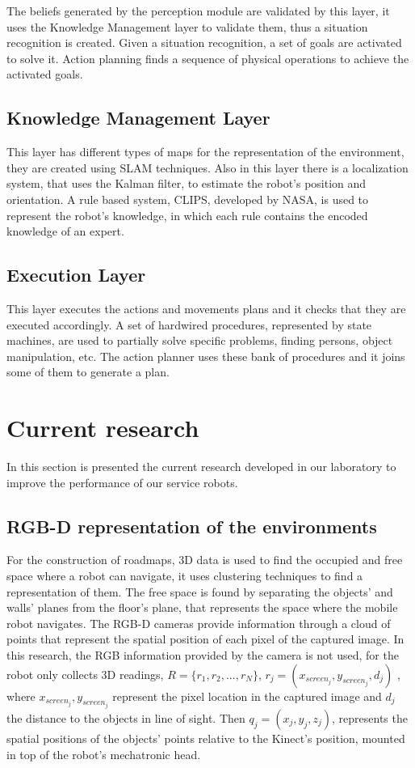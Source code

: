 \documentclass{llncs}
\begin{document}
The beliefs generated by the perception module are validated by this layer, it uses the Knowledge Management layer
to validate them, thus a situation recognition is created.
Given a situation recognition, a set of goals are activated to solve it.
Action planning finds a sequence of physical operations to achieve the activated goals.


\subsection{Knowledge Management Layer}

This layer has different types of maps for the representation of the environment, they are created using 
SLAM techniques.
Also in this layer there is a localization system, that uses the Kalman filter, to estimate the robot's position and orientation.
A rule based system, CLIPS, developed by NASA, is used to represent the robot's knowledge, in which each rule contains the
encoded knowledge of an expert.


\subsection{Execution Layer}
This layer executes the actions and movements plans and it checks that they are executed accordingly.
A set of hardwired procedures, represented by state machines, are used to partially solve specific problems, finding persons,
object manipulation, etc. The action planner uses these bank of procedures and it joins some of them to generate a plan.



\section{Current research}\label{sec:CurrentResearch}
In this section is presented the current research developed in our laboratory to improve the performance of our service
robots.

\subsection{RGB-D representation of the environments}\label{subsec:SurfRecon}
For the construction of roadmaps, 3D data is used to find the occupied and free space where a robot can
navigate, it uses clustering techniques to find a representation of them.
The free space is found by separating the objects' and walls' planes from the floor's plane, that represents the space where the mobile
robot navigates.
The RGB-D cameras provide information through a cloud of points that represent the spatial position of each pixel of the 
captured image.  In this research, the RGB information provided by the camera is not used, for the
robot only collects 3D readings, \(R=\{ r_1,r_2,...,r_{N}\}\),
\(r_j = (x_{screen_j},y_{screen_j},d_j)\) , where \(x_{screen_j},y_{screen_j}\) represent the pixel location in the captured image and
\(d_j\) the distance to the objects in line of sight.
Then \(q_j = (x_j,y_j,z_j)\), represents the spatial positions of the objects' points relative to the Kinect's position, mounted
in top of the robot's mechatronic head.
\end{document}
